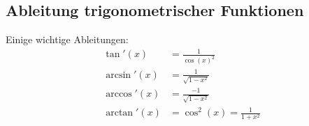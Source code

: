 \subsection{Ableitung trigonometrischer Funktionen}

\vspace{1\baselineskip}

Einige wichtige Ableitungen:
\begin{align*}
    \tan'(x) &= \frac{1}{\cos(x)^2}
    \\
    \arcsin'(x) &= \frac{1}{\sqrt{1-x^2}}
    \\
    \arccos'(x) &= \frac{-1}{\sqrt{1-x^2}}
    \\
    \arctan'(x) &= \cos^2(x) = \frac{1}{1 + x^2}
\end{align*}
